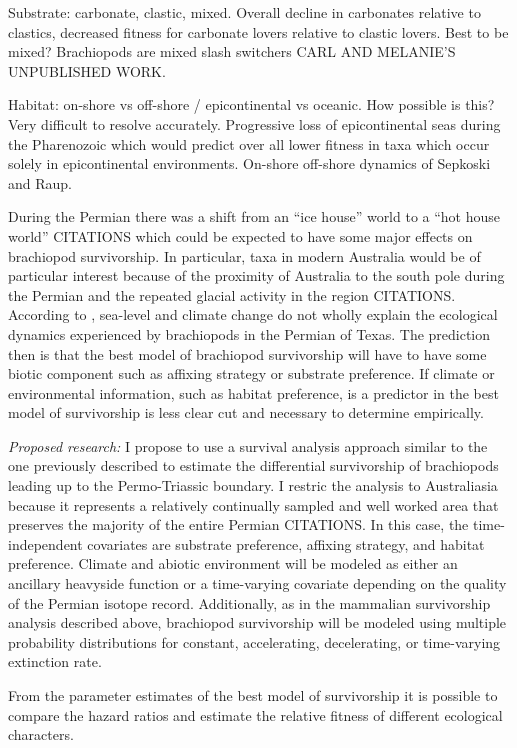 \documentclass[12pt,letterpaper]{article}
\begin{document}
Substrate: carbonate, clastic, mixed. Overall decline in carbonates relative to clastics, decreased fitness for carbonate lovers relative to clastic lovers. Best to be mixed? Brachiopods are mixed slash switchers CARL AND MELANIE'S UNPUBLISHED WORK.

Habitat: on-shore vs off-shore / epicontinental vs oceanic. How possible is this? Very difficult to resolve accurately. Progressive loss of epicontinental seas during the Pharenozoic which would predict over all lower fitness in taxa which occur solely in epicontinental environments. On-shore off-shore dynamics of Sepkoski and Raup.

During the Permian there was a shift from an ``ice house'' world to a ``hot house world'' CITATIONS which could be expected to have some major effects on brachiopod survivorship. In particular, taxa in modern Australia would be of particular interest because of the proximity of Australia to the south pole during the Permian and the repeated glacial activity in the region CITATIONS. According to \citet{Olszewski2004}, sea-level and climate change do not wholly explain the ecological dynamics experienced by brachiopods in the Permian of Texas. The prediction then is that the best model of brachiopod survivorship will have to have some biotic component such as affixing strategy or substrate preference. If climate or environmental information, such as habitat preference, is a predictor in the best model of survivorship is less clear cut and necessary to determine empirically.

\textit{Proposed research:}
I propose to use a survival analysis approach similar to the one previously described to estimate the differential survivorship of brachiopods leading up to the Permo-Triassic boundary. I restric the analysis to Australiasia because it represents a relatively continually sampled and well worked area that preserves the majority of the entire Permian CITATIONS. In this case, the time-independent covariates are substrate preference, affixing strategy, and habitat preference. Climate and abiotic environment will be modeled as either an ancillary heavyside function or a time-varying covariate depending on the quality of the Permian isotope record. Additionally, as in the mammalian survivorship analysis described above, brachiopod survivorship will be modeled using multiple probability distributions for constant, accelerating, decelerating, or time-varying extinction rate.

From the parameter estimates of the best model of survivorship it is possible to compare the hazard ratios and estimate the relative fitness of different ecological characters.
\end{document}
